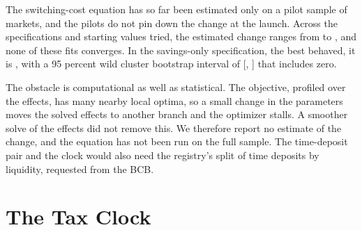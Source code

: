 The switching-cost equation has so far been estimated only on a pilot sample of  markets, and the pilots do not pin down the change at the launch. Across the specifications and starting values tried, the estimated change ranges from  to , and none of these fits converges. In the savings-only specification, the best behaved, it is , with a 95 percent wild cluster bootstrap interval of [, ] that includes zero.

The obstacle is computational as well as statistical. The objective, profiled over the effects, has many nearby local optima, so a small change in the parameters moves the solved effects to another branch and the optimizer stalls. A smoother solve of the effects did not remove this. We therefore report no estimate of the change, and the equation has not been run on the full sample. The time-deposit pair and the clock would also need the registry's split of time deposits by liquidity, requested from the BCB.


\section{The Tax Clock}\label{app:clock}

